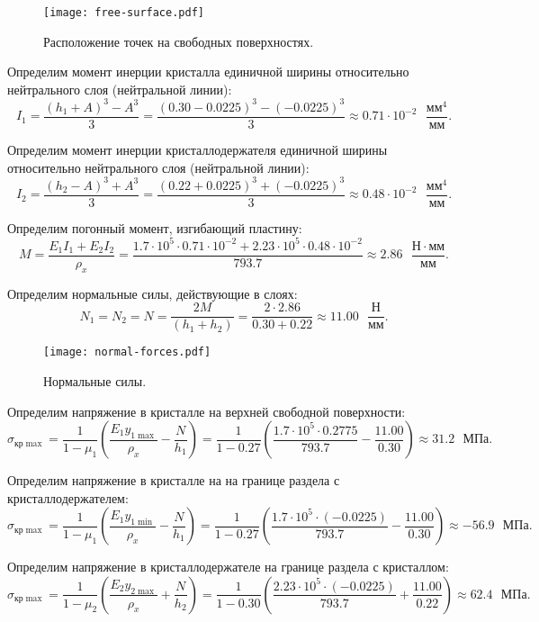 \begin{figure}[h]
    \centering
    \texttt{[image: free-surface.pdf]}
    \caption{Расположение точек на свободных поверхностях.}
    \label{fig:free-surface}
\end{figure}

Определим момент инерции кристалла единичной ширины относительно нейтрального слоя (нейтральной линии):
\[
    I_1 = \frac{(h_1 + A)^3 - A^3}{3}
        = \frac{(0.30 - 0.0225)^3 - (-0.0225)^3}{3}
        \approx 0.71 \cdot 10^{-2} \text{ } \frac{мм^4}{мм}.
\]

Определим момент инерции кристаллодержателя единичной ширины относительно нейтрального слоя (нейтральной линии):
\[
    I_2 = \frac{(h_2 - A)^3 + A^3}{3}
        = \frac{(0.22 + 0.0225)^3 + (-0.0225)^3}{3}
        \approx 0.48 \cdot 10^{-2} \text{ } \frac{мм^4}{мм}.
\]

Определим погонный момент, изгибающий пластину:
\[
    M = \frac{E_1 I_1 + E_2 I_2}{\rho_x}
      = \frac{1.7 \cdot 10^5 \cdot 0.71 \cdot 10^{-2} + 2.23 \cdot 10^5 \cdot 0.48 \cdot 10^{-2}}{793.7}
      \approx 2.86 \text{ } \frac{Н \cdot мм}{мм}.
\]

Определим нормальные силы, действующие в слоях:
\[
    N_1 = N_2 = N
        = \frac{2M}{(h_1 + h_2)}
        = \frac{2 \cdot 2.86}{0.30 + 0.22}
        \approx 11.00 \text{ } \frac{Н}{мм}.
\]

\begin{figure}[h]
    \centering
    \texttt{[image: normal-forces.pdf]}
    \caption{Нормальные силы.}
    \label{fig:normal-forces}
\end{figure}

Определим напряжение в кристалле на верхней свободной поверхности:
\[
    \sigma_{кр \max} = \frac{1}{1 - \mu_1} \left(\frac{E_1 y_{1\max}}{\rho_x} - \frac{N}{h_1}\right)
                     = \frac{1}{1 - 0.27} \left(\frac{1.7 \cdot 10^5 \cdot 0.2775}{793.7} - \frac{11.00}{0.30}\right)
                     \approx 31.2 \text{ } МПа.
\]

Определим напряжение в кристалле на на границе раздела с кристаллодержателем:
\[
    \sigma_{кр \max} = \frac{1}{1 - \mu_1} \left(\frac{E_1 y_{1\min}}{\rho_x} - \frac{N}{h_1}\right)
                     = \frac{1}{1 - 0.27} \left(\frac{1.7 \cdot 10^5 \cdot (-0.0225)}{793.7} - \frac{11.00}{0.30}\right)
                     \approx -56.9\text{ } МПа.
\]

Определим напряжение в кристаллодержателе на границе раздела с кристаллом:
\[
    \sigma_{кр \max} = \frac{1}{1 - \mu_2} \left(\frac{E_2 y_{2\max}}{\rho_x} + \frac{N}{h_2}\right)
                     = \frac{1}{1 - 0.30} \left(\frac{2.23 \cdot 10^5 \cdot (-0.0225)}{793.7} + \frac{11.00}{0.22}\right)
                     \approx 62.4\text{ } МПа.
\]

